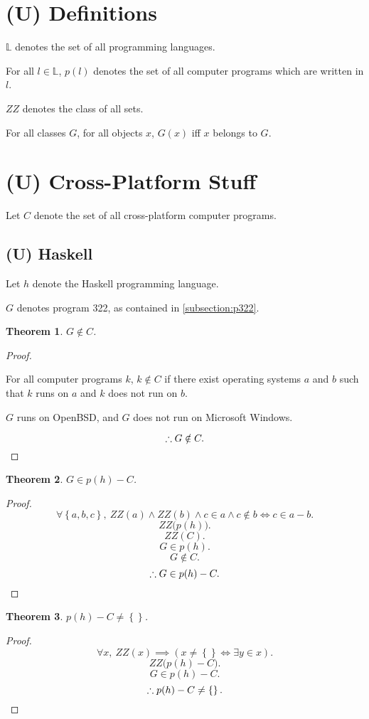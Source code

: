 \documentclass{article}
\newtheorem{thm}{Theorem}
\begin{document}
	\section{(U) Definitions}
		$\mathbb L$ denotes the set of all programming languages.

		For all $l \in \mathbb L$, $p(l)$ denotes the set of all computer
		programs which are written in $l$.

		$\mathit{ZZ}$ denotes the class of all sets.

		For all classes $G$, for all objects $x$, $G(x)$ iff $x$ belongs to
		$G$.
	\section{(U) Cross-Platform Stuff}
			Let $C$ denote the set of all cross-platform computer programs.
		\subsection{(U) Haskell}
			Let $h$ denote the Haskell programming language.

			$G$ denotes program 322, as contained in \cref{subsection:p322}.
			\begin{thm}
				$G \notin C$.
			\end{thm}
			\begin{proof}
				${}$

				For all computer programs $k$, $k \notin C$ if there exist
				operating systems $a$ and $b$ such that $k$ runs on $a$ and
				$k$ does not run on $b$.

				$G$ runs on OpenBSD, and $G$ does not run on Microsoft Windows.

				\[
					\therefore G \notin C.\qedhere
				\]
			\end{proof}
			\begin{thm}
				$G \in p(h) - C$.
			\end{thm}
			\begin{proof}
				\[
					\forall \left\{a,b,c\right\},\ 
					\mathit{ZZ}(a) \land \mathit{ZZ}(b) \land
					c \in a \land c \notin b \iff c \in a - b.
				\]
				\[
					\mathit{ZZ}\big(p(h)\big).
				\]
				\[
					\mathit{ZZ}(C).
				\]
				\[
					G \in p(h).
				\]
				\[
					G \notin C.
				\]
				\[
					\therefore G \in p(h) - C.\qedhere
				\]
			\end{proof}
			\begin{thm}
				$p(h) - C \neq \left\{\right\}$.
			\end{thm}
			\begin{proof}
				\[
					\forall x,\ 
					\mathit{ZZ}(x) \implies 
					\left(x \neq \left\{\right\} \iff \exists y \in x\right).
				\]
				\[
					\mathit{ZZ}\big(p(h) - C\big).
				\]
				\[
					G \in p(h) - C.
				\]
				\[
					\therefore p(h) - C \neq \left\{\right\}.\qedhere
				\]
			\end{proof}
\end{document}
